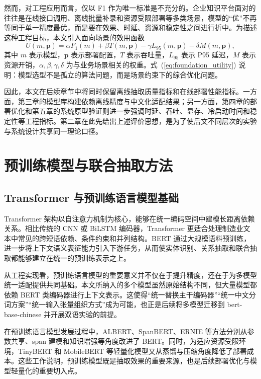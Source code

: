 然而，对工程应用而言，仅以 F1 作为唯一标准是不充分的。企业知识平台面对的往往是在线接口调用、离线批量补录和资源受限部署等多类场景，模型的“优”不再等同于单一精度最优，而是要在效果、时延、资源和稳定性之间进行折中。为描述这种工程目标，本文引入面向场景的效用函数
\begin{equation}
U(m,\mathbf{p})=\alpha F_{1}(m)+\beta T(m,\mathbf{p})-\gamma L_{95}(m,\mathbf{p})-\delta M(m,\mathbf{p}),
\label{eq:foundation_utility}
\end{equation}
其中 $m$ 表示模型，$\mathbf{p}$ 表示部署配置，$T$ 表示吞吐量，$L_{95}$ 表示 P95 延迟，$M$ 表示资源开销，$\alpha,\beta,\gamma,\delta$ 为与业务场景相关的权重。式~(\ref{eq:foundation_utility}) 说明：模型选型不是孤立的算法问题，而是场景约束下的综合优化问题。

因此，本文在后续章节中将同时保留离线抽取质量指标和在线部署性能指标。一方面，第三章的模型库构建依赖离线精度与中文化适配结果；另一方面，第四章的部署优化和第五章的系统原型验证则进一步强调时延、吞吐、显存、冷启动时间和稳定性等工程指标。第二章在此先给出上述评价思想，是为了使后文不同层次的实验与系统设计共享同一理论口径。

\section{预训练模型与联合抽取方法}
\subsection{Transformer 与预训练语言模型基础}
Transformer 架构以自注意力机制为核心，能够在统一编码空间中建模长距离依赖关系\cite{vaswani2017}。相比传统的 CNN 或 BiLSTM 编码器，Transformer 更适合处理制造业文本中常见的跨短语依赖、条件约束和并列结构。BERT 通过大规模语料预训练，进一步将上下文语义表征能力引入下游任务\cite{bert2019}，从而使实体识别、关系抽取和联合抽取都能够建立在统一的预训练表示之上。

从工程实现看，预训练语言模型的重要意义并不仅在于提升精度，还在于为多模型统一适配提供共同基础。本文所纳入的多个模型虽然原始结构不同，但大量模型都依赖 BERT 类编码器进行上下文表示。这使得“统一替换主干编码器”“统一中文分词方案”“统一输入张量组织方式”成为可能，也正是后续将多模型迁移到 bert-base-chinese 并开展双语实验的前提。

在预训练语言模型发展过程中，ALBERT、SpanBERT、ERNIE 等方法分别从参数共享、span 建模和知识增强等角度改进了 BERT\cite{albert2020,spanbert2020,ernie2019}。同时，为适应资源受限环境，TinyBERT 和 MobileBERT 等轻量化模型又从蒸馏与压缩角度降低了部署成本\cite{tinybert2020,mobilebert2020}。这些工作说明，预训练模型既是抽取效果的重要来源，也是后续部署优化与模型轻量化的重要切入点。

